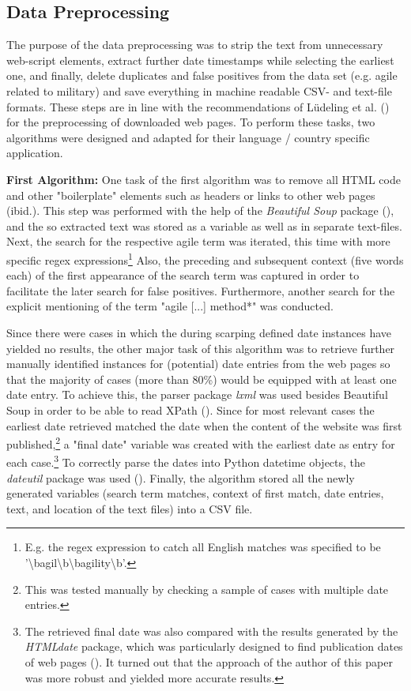 \subsection{Data Preprocessing}
The purpose of the data  preprocessing was to strip the text from unnecessary web-script elements, extract further date timestamps while selecting the earliest one, and finally, delete duplicates and false positives from the data set (e.g. agile related to military) and save everything in machine readable CSV- and text-file formats. These steps are in line with the recommendations of Lüdeling et al. (\cite*[p. 19]{Ludeling2015}) for the preprocessing of downloaded web pages. To perform these tasks, two algorithms were designed and adapted for their language / country specific application. \par 
\textbf{First Algorithm:} One task of the first algorithm was to remove all HTML code and other "boilerplate" elements such as headers or links to other web pages (ibid.). This step was performed with the help of the \textit{Beautiful Soup} package (\cite{Richardson2007}), and the so extracted text was stored as a variable as well as in separate text-files. Next, the search for the respective agile term was iterated, this time with more specific regex expressions\footnote{E.g. the regex expression to catch all English matches was specified to be '\textbackslash bagil\textbackslash b\textbar \textbackslash bagility\textbackslash b'.} Also, the preceding and subsequent context (five words each) of the first appearance of the search term was captured in order to facilitate the later search for false positives. Furthermore, another search for the explicit mentioning of the term "agile [...] method*" was conducted.\par 
Since there were cases in which the during scarping defined date instances have yielded no results, the other major task of this algorithm was to retrieve further manually identified instances for (potential) date entries from the web pages so that the majority of cases (more than 80\%) would be equipped with at least one date entry. To achieve this, the parser package \textit{lxml} was used besides Beautiful Soup in order to be able to read XPath (\cite{Faassen2006, Clark1999}). Since for most relevant cases the earliest date retrieved matched the date when the content of the website was first published,\footnote{This was tested manually by checking a sample of cases with multiple date entries.} a "final date" variable was created with the earliest date as entry for each case.\footnote{The retrieved final date was also compared with the results generated by the \textit{HTMLdate} package, which was particularly designed to find publication dates of web pages (\cite{Barbaresi2020}). It turned out that the approach of the author of this paper was more robust and yielded more accurate results.} To correctly parse the dates into Python datetime objects, the \textit{dateutil} package was used (\cite{Niemeyer2003}). Finally, the algorithm stored all the newly generated variables (search term matches, context of first match, date entries, text, and location of the text files) into a CSV file.\par
